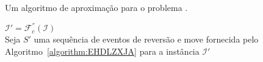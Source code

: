 \begin{algorithm}[!tbh]
  \caption{Um algoritmo de aproximação para o problema \SbFIRM{}.\label{algorithm:VOHUBSMM}}
  $\mathcal{I}' = \mathcal{F}_{c}^{''}(\mathcal{I})$ \\
  Seja $S'$ uma sequência de eventos de reversão e move fornecida pelo Algoritmo~\ref{algorithm:EHDLZXJA} para a instância $\mathcal{I}'$ \\
\end{algorithm}